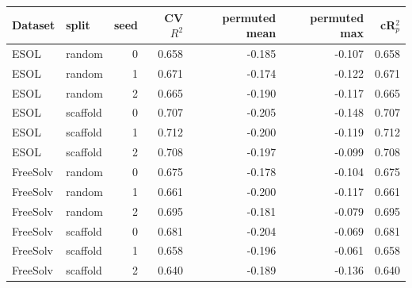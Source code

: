 \begin{tabular}{llrrrrr}
\toprule
Dataset & split & seed & CV $R^2$ & permuted mean & permuted max & cR$^2_p$ \\
\midrule
ESOL & random & 0 & 0.658 & -0.185 & -0.107 & 0.658 \\
ESOL & random & 1 & 0.671 & -0.174 & -0.122 & 0.671 \\
ESOL & random & 2 & 0.665 & -0.190 & -0.117 & 0.665 \\
ESOL & scaffold & 0 & 0.707 & -0.205 & -0.148 & 0.707 \\
ESOL & scaffold & 1 & 0.712 & -0.200 & -0.119 & 0.712 \\
ESOL & scaffold & 2 & 0.708 & -0.197 & -0.099 & 0.708 \\
FreeSolv & random & 0 & 0.675 & -0.178 & -0.104 & 0.675 \\
FreeSolv & random & 1 & 0.661 & -0.200 & -0.117 & 0.661 \\
FreeSolv & random & 2 & 0.695 & -0.181 & -0.079 & 0.695 \\
FreeSolv & scaffold & 0 & 0.681 & -0.204 & -0.069 & 0.681 \\
FreeSolv & scaffold & 1 & 0.658 & -0.196 & -0.061 & 0.658 \\
FreeSolv & scaffold & 2 & 0.640 & -0.189 & -0.136 & 0.640 \\
\bottomrule
\end{tabular}
